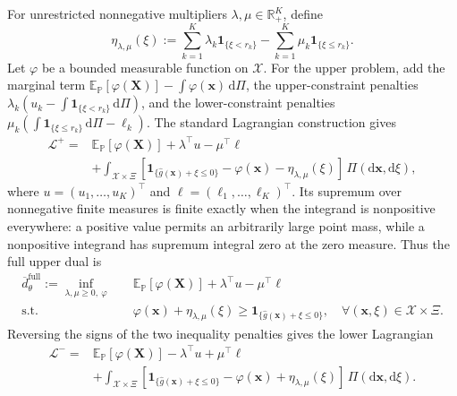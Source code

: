 For unrestricted nonnegative multipliers $\lambda,\mu\in\mathbb R_+^K$, define
\begin{equation}
  \eta_{\lambda,\mu}(\xi):=
  \sum_{k=1}^K\lambda_k\mathbf1_{\{\xi<r_k\}}
  -\sum_{k=1}^K\mu_k\mathbf1_{\{\xi\le r_k\}}.
  \label{eq-dual-step-function}
\end{equation}
Let $\varphi$ be a bounded measurable function on $\mathcal X$. For the upper problem, add the marginal term
$\mathbb E_{\mathbb P}[\varphi(\bm X)]-\int\varphi(\bm x)\,\mathrm d\Pi$,
the upper-constraint penalties
$\lambda_k(u_k-\int\mathbf1_{\{\xi<r_k\}}\,\mathrm d\Pi)$,
and the lower-constraint penalties
$\mu_k(\int\mathbf1_{\{\xi\le r_k\}}\,\mathrm d\Pi-\ell_k)$.
The standard Lagrangian construction \citep[Section~5.1]{B.V04} gives
\begin{equation}
  \begin{aligned}
    \mathcal L^+={}&\mathbb E_{\mathbb P}\left[\varphi(\bm X)\right]+\lambda^\top u-\mu^\top\ell\\
    &+\int_{\mathcal X\times\Xi}
    \left[\mathbf1_{\{\hat g(\bm x)+\xi\le0\}}-\varphi(\bm x)-\eta_{\lambda,\mu}(\xi)\right]\,\Pi\left(\mathrm d\bm x,\mathrm d\xi\right),
  \end{aligned}
  \label{eq-upper-lagrangian}
\end{equation}
where $u=(u_1,\ldots,u_K)^\top$ and $\ell=(\ell_1,\ldots,\ell_K)^\top$. Its supremum over nonnegative finite measures is finite exactly when the integrand is nonpositive everywhere: a positive value permits an arbitrarily large point mass, while a nonpositive integrand has supremum integral zero at the zero measure. Thus the full upper dual is
\begin{equation}
  \begin{aligned}
    \overline d_\theta^{\mathrm{full}}:=\inf_{\lambda,\mu\ge0,\ \varphi}\quad&
    \mathbb E_{\mathbb P}\left[\varphi(\bm X)\right]+\lambda^\top u-\mu^\top\ell\\
    \text{s.t.}\quad&\varphi(\bm x)+\eta_{\lambda,\mu}(\xi)
    \ge\mathbf1_{\{\hat g(\bm x)+\xi\le0\}},
    \quad\forall(\bm x,\xi)\in\mathcal X\times\Xi.
  \end{aligned}
  \label{eq-upper-measure-dual}
\end{equation}
Reversing the signs of the two inequality penalties gives the lower Lagrangian
\begin{equation}
  \begin{aligned}
    \mathcal L^-={}&\mathbb E_{\mathbb P}\left[\varphi(\bm X)\right]-\lambda^\top u+\mu^\top\ell\\
    &+\int_{\mathcal X\times\Xi}
    \left[\mathbf1_{\{\hat g(\bm x)+\xi\le0\}}-\varphi(\bm x)+\eta_{\lambda,\mu}(\xi)\right]\,\Pi\left(\mathrm d\bm x,\mathrm d\xi\right).
  \end{aligned}
  \label{eq-lower-lagrangian}
\end{equation}
